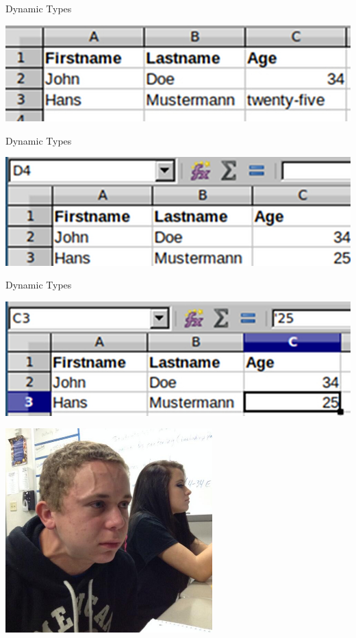 \documentclass[aspectratio=169,notes]{beamer}
\begin{document}
	\begin{frame}[fragile]{Dynamic Types}
		\begin{center}
		\includegraphics[width=1.0\textwidth]{exceldynamic.jpg}
		\end{center}
	\end{frame}

	\begin{frame}[fragile]{Dynamic Types}
		\begin{center}
		\includegraphics[width=1.0\textwidth]{exceldynamic2.jpg}
		\end{center}
	\end{frame}

	\begin{frame}[fragile]{Dynamic Types}
		\begin{center}
		\includegraphics[width=1.0\textwidth]{exceldynamic3.jpg}
		\end{center}
	\end{frame}

	\begin{frame}[fragile]
		\begin{center}
		\includegraphics[width=0.6\textwidth]{boyholdingfart.jpg}
		\end{center}
	\end{frame}
\end{document}
